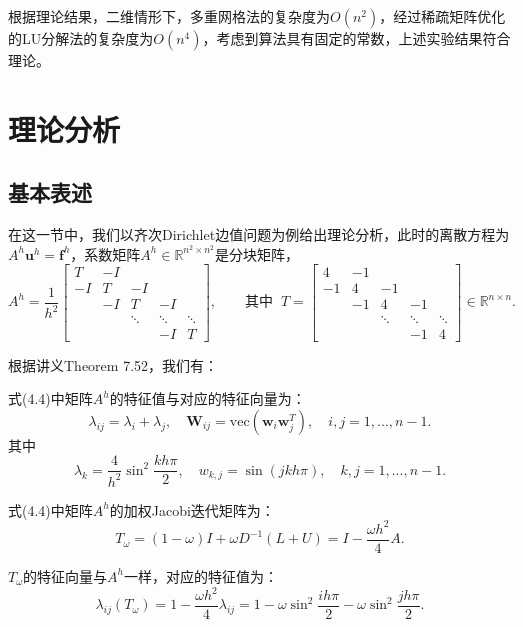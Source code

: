 \documentclass[lang=cn,10pt]{elegantbook}
\begin{document}
根据理论结果，二维情形下，多重网格法的复杂度为$O(n^2)$，经过稀疏矩阵优化的LU分解法的复杂度为$O(n^4)$，考虑到算法具有固定的常数，上述实验结果符合理论。

\section{理论分析}

\subsection{基本表述}

在这一节中，我们以齐次Dirichlet边值问题为例给出理论分析，此时的离散方程为$A^h\mathbf{u}^h=\mathbf{f}^h$，系数矩阵$A^h\in\mathbb{R}^{n^2\times n^2}$是分块矩阵，
\begin{equation}
  A^h=\frac{1}{h^2}\begin{bmatrix}
    T & -I & \\
    -I & T & -I & \\
    & -I & T & -I &\\
    & & \ddots & \ddots & \ddots\\
    & & & -I & T
  \end{bmatrix},\qquad \text{其中}\;\;
  T=\begin{bmatrix}
    4 & -1 & \\
    -1 & 4 & -1 & \\
    & -1 & 4 & -1 &\\
    & & \ddots & \ddots & \ddots\\
    & & & -1 & 4
  \end{bmatrix}\in\mathbb{R}^{n\times n}.
\end{equation}

根据讲义Theorem 7.52，我们有：
\begin{theorem}
  式(4.4)中矩阵$A^h$的特征值与对应的特征向量为：
  \begin{equation}
    \lambda_{ij}=\lambda_i+\lambda_j,\quad \mathbf{W}_{ij}=\text{vec}(\mathbf{w}_i\mathbf{w}_j^T),\quad i,j=1,...,n-1.
  \end{equation}
  其中
  \begin{equation}
    \lambda_k=\frac{4}{h^2}\sin^2\frac{kh\pi}{2},\quad w_{k,j}=\sin(jkh\pi),\quad k,j=1,...,n-1.
  \end{equation}
\end{theorem}

\begin{lemma}
  式(4.4)中矩阵$A^h$的加权Jacobi迭代矩阵为：
  \begin{equation}
    T_\omega=(1-\omega)I+\omega D^{-1}(L+U)=I-\frac{\omega h^2}{4}A.
  \end{equation}

  $T_\omega$的特征向量与$A^h$一样，对应的特征值为：
  \begin{equation}
    \lambda_{ij}(T_\omega)=1-\frac{\omega h^2}{4}\lambda_{ij}=1-\omega\sin^2\frac{ih\pi}{2}-\omega\sin^2\frac{jh\pi}{2}.
  \end{equation}
\end{lemma}
\end{document}

